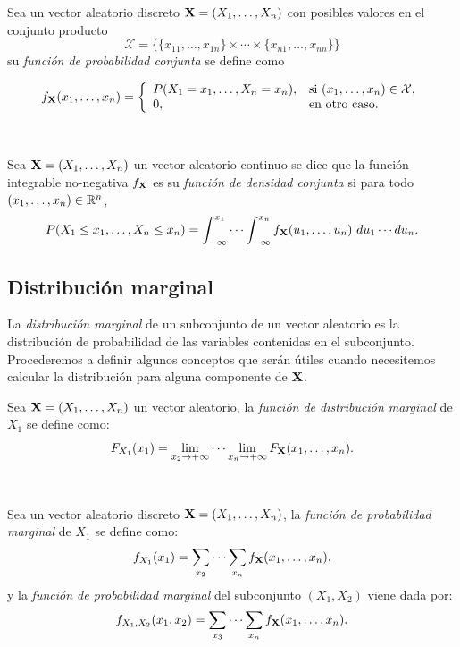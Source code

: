 \documentclass[oneside,openright,titlepage,numbers=noenddot,openany,headinclude,footinclude=true,
cleardoublepage=empty,abstractoff,BCOR=5mm,paper=a4,fontsize=12pt,main=spanish]{scrreprt}
\begin{document}
\begin{definition}
Sea un vector aleatorio discreto $\textbf{X}=(X_1,\dots,X_n)$ con posibles valores en el conjunto producto $$\mathcal{X}=\Big\lbrace \{x_{11},\dots,x_{1n}\}\times \cdots \times \{x_{n1},\dots,x_{nn}\} \Big\rbrace$$ su \textit{función de probabilidad conjunta} se define como

$$f_{\textbf{X}}(x_1,\dots,x_n)= \left \{
\begin{array}{l l}
P(X_1=x_1,\dots,X_n=x_n), & \mbox{si } (x_1,\dots,x_n)\in \mathcal{X}, \\
0, & \mbox{en otro caso}.
\end{array}
\right.$$
\end{definition}\

\begin{definition}
Sea $\textbf{X}=(X_1,\dots,X_n)$ un vector aleatorio continuo se dice que la función integrable no-negativa $f_{\textbf{X}}$ es su \textit{función de densidad conjunta} si para todo $(x_1,\dots,x_n) \in \mathbb{R}^n$, $$P(X_1\leq x_1,\dots, X_n \leq x_n)=\int_{-\infty}^{x_1} \cdots \int_{-\infty}^{x_n} f_{\textbf{X}}(u_1,\dots,u_n) \ du_1 \cdots du_n.$$ 
\end{definition}

\subsection{Distribución marginal}

La \textit{distribución marginal} de un subconjunto de un vector aleatorio es la distribución de probabilidad de las variables contenidas en el subconjunto. Procederemos a definir algunos conceptos que serán útiles cuando necesitemos calcular la distribución para alguna componente de $\textbf{X}$.\\

\begin{definition}
Sea $\textbf{X}=(X_1,\dots,X_n)$ un vector aleatorio, la \textit{función de distribución marginal} de $X_1$ se define como: $$F_{X_1}(x_1)=\lim_{x_2\to +\infty}\cdots \lim_{x_n\to +\infty} F_{\textbf{X}}(x_1,\dots,x_n).$$
\end{definition}\

\begin{definition}
Sea un vector aleatorio discreto $\textbf{X}=(X_1,\dots,X_n)$, la \textit{función de probabilidad marginal} de $X_1$ se define como: $$f_{X_1} (x_1)=\sum_{x_2} \cdots \sum_{x_n} f_{\textbf{X}}(x_1,\dots,x_n),$$ y la \textit{función de probabilidad marginal} del subconjunto $(X_1,X_2)$ viene dada por:$$f_{X_1,X_2} (x_1,x_2)=\sum_{x_3} \cdots \sum_{x_n} f_{\textbf{X}}(x_1,\dots,x_n).$$
\end{definition}\
\end{document}
